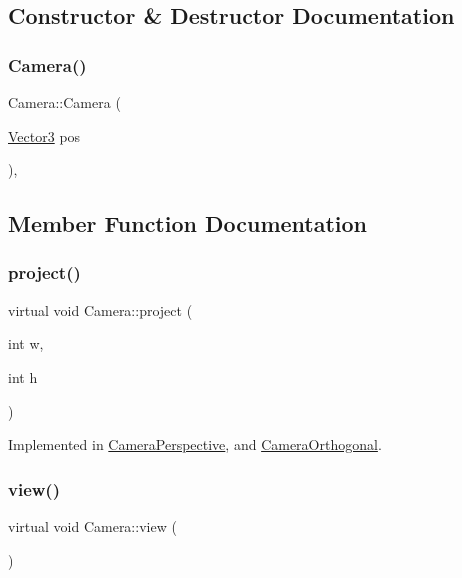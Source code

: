 \subsection{Constructor \& Destructor Documentation}
\mbox{\label{class_camera_a92eff4b0c0b15b38222318840552d27b}} 
\subsubsection{\texorpdfstring{Camera()}{Camera()}}
{\footnotesize\ttfamily Camera\+::\+Camera (\begin{DoxyParamCaption}\item[{\hyperlink{class_vector3}{Vector3}}]{pos }\end{DoxyParamCaption})\hspace{0.3cm}{\ttfamily [inline]}, {\ttfamily [explicit]}}



\subsection{Member Function Documentation}
\mbox{\label{class_camera_a5b50ba31455a712ec09561105c12c7c2}} 
\subsubsection{\texorpdfstring{project()}{project()}}
{\footnotesize\ttfamily virtual void Camera\+::project (\begin{DoxyParamCaption}\item[{int}]{w,  }\item[{int}]{h }\end{DoxyParamCaption})\hspace{0.3cm}{\ttfamily [pure virtual]}}



Implemented in \hyperlink{class_camera_perspective_a841f648f4131897ec632cfcb55facf97}{Camera\+Perspective}, and \hyperlink{class_camera_orthogonal_a593df7d7b84de30d312e31ffed831d9c}{Camera\+Orthogonal}.

\mbox{\label{class_camera_a151cbf3898d114f0a8bf079a3e90e7f4}} 
\subsubsection{\texorpdfstring{view()}{view()}}
{\footnotesize\ttfamily virtual void Camera\+::view (\begin{DoxyParamCaption}{ }\end{DoxyParamCaption})\hspace{0.3cm}{\ttfamily [pure virtual]}}



